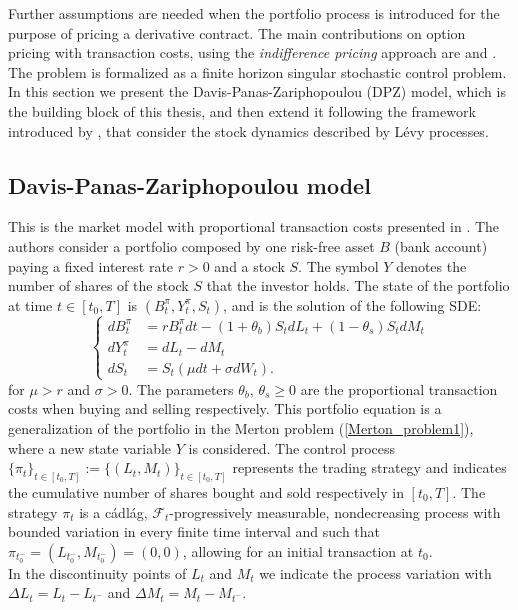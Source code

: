 Further assumptions are needed when the portfolio process is introduced for the purpose of pricing a derivative contract.
The main contributions on option pricing with transaction costs, using the \emph{indifference pricing} approach are
\cite{HoNe89} and \cite{DaPaZa93}. The problem is formalized as a finite horizon singular stochastic control problem.
In this section we present the Davis-Panas-Zariphopoulou (DPZ) model, 
which is the building block of this thesis, and then extend it following the framework introduced by \cite{Kab16}, 
that consider the stock dynamics described by Lévy processes.



\subsection{Davis-Panas-Zariphopoulou model}\label{DPZ_sec}

This is the market model with proportional transaction costs presented in \cite{DaPaZa93}. 
The authors consider a portfolio composed by one risk-free asset $B$ (bank account) paying a fixed interest rate $r > 0$ and a stock $S$. 
The symbol $Y$ denotes the number of shares of the stock $S$ that the investor holds. 
The state of the portfolio at time $t\in [t_0,T]$ is $(B^{\pi}_t,Y^{\pi}_t,S_t)$, and is the solution of the following SDE:
\begin{equation}\label{DPZ_porfolio_dynamics}
 \begin{cases}
 dB^{\pi}_t &=  rB^{\pi}_t dt - (1+\theta_b)S_t dL_t + (1-\theta_s) S_t dM_t \\
 dY^{\pi}_t &=  dL_t - dM_t \\
 dS_t &=  S_t \left( \mu dt + \sigma dW_t \right).
\end{cases}
\end{equation} 
for $\mu>r$ and $\sigma>0$.
The parameters $\theta_b$, $\theta_s \geq 0$ are the proportional transaction costs when buying and selling respectively.
This portfolio equation is a generalization of the portfolio in the Merton problem (\ref{Merton_problem1}), 
where a new state variable $Y$ is considered.
The control process $\{\pi_t\}_{t \in [t_0,T]} := \{(L_t,M_t)\}_{t \in [t_0,T]}$ represents the trading strategy and indicates the 
cumulative number of shares bought and sold respectively in $[t_0,T]$.
The strategy $\pi_t$ is a cádlág, $\mathcal{F}_t$-progressively measurable, nondecreasing process with bounded variation in every finite time interval and such that
$ \pi_{t_0^-} = ( L_{t_0^-} , M_{t_0^-} ) = (0,0) $, allowing for an initial transaction at $t_0$.\\
In the discontinuity points of $L_t$ and $M_t$ we indicate the process variation with $\Delta L_t= L_{t}-L_{t^-}$ and $\Delta M_t= M_{t}-M_{t^-}$.

